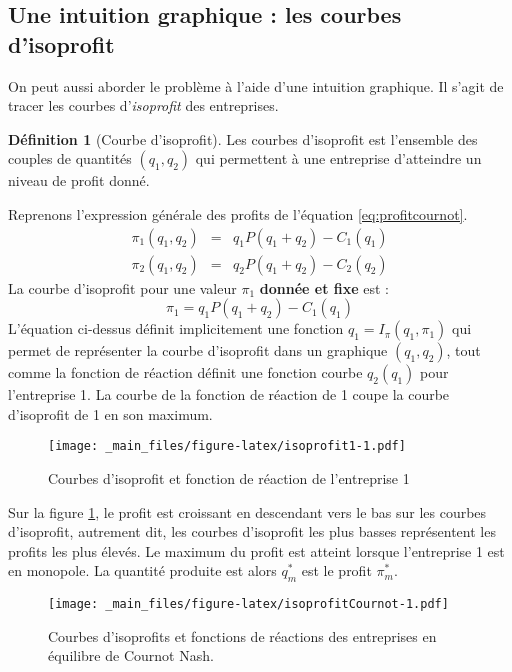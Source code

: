 \documentclass[
]{book}
\theoremstyle{definition}
\newtheorem{definition}{Définition}[chapter]
\theoremstyle{definition}
\theoremstyle{definition}
\theoremstyle{definition}
\theoremstyle{remark}
\begin{document}
\hypertarget{une-intuition-graphique-les-courbes-disoprofit}{%
\subsection{Une intuition graphique : les courbes d'isoprofit}\label{une-intuition-graphique-les-courbes-disoprofit}}

On peut aussi aborder le problème à l'aide d'une intuition graphique.
Il s'agit de tracer les courbes d'\emph{isoprofit} des entreprises.

\begin{definition}[Courbe d'isoprofit]
Les courbes d'isoprofit est l'ensemble des couples de quantités \((q_1, q_2)\) qui permettent à une entreprise d'atteindre un niveau de profit donné.
\end{definition}

Reprenons l'expression générale des profits de l'équation \eqref{eq:profitcournot}.
\[
\begin{array}{rcl}
\pi_1(q_1, q_2) &=& q_1P(q_1+q_2)-C_1(q_1)\\
\pi_2(q_1, q_2) &=& q_2P(q_1+q_2) -C_2(q_2)
\end{array}
\]
La courbe d'isoprofit pour une valeur \(\pi_1\) \textbf{donnée et fixe} est :
\[
\pi_1 = q_1P(q_1+q_2)-C_1(q_1)
\]
L'équation ci-dessus définit implicitement une fonction \(q_1=I_\pi(q_1, \pi_1)\) qui permet de représenter la courbe d'isoprofit dans un graphique \((q_1,q_2)\), tout comme la fonction de réaction définit une fonction courbe \(q_2(q_1)\) pour l'entreprise 1.
La courbe de la fonction de réaction de 1 coupe la courbe d'isoprofit de 1 en son maximum.

\begin{figure}
\centering
\texttt{[image: \_main\_files/figure-latex/isoprofit1-1.pdf]}
\caption{\label{fig:isoprofit1}Courbes d'isoprofit et fonction de réaction de l'entreprise 1}
\end{figure}

Sur la figure \ref{fig:isoprofit1}, le profit est croissant en descendant vers le bas sur les courbes d'isoprofit, autrement dit, les courbes d'isoprofit les plus basses représentent les profits les plus élevés.
Le maximum du profit est atteint lorsque l'entreprise 1 est en monopole.
La quantité produite est alors \(q_m^*\) est le profit \(\pi_m^*\).

\begin{figure}
\centering
\texttt{[image: \_main\_files/figure-latex/isoprofitCournot-1.pdf]}
\caption{\label{fig:isoprofitCournot}Courbes d'isoprofits et fonctions de réactions des entreprises en équilibre de Cournot Nash.}
\end{figure}
\end{document}
